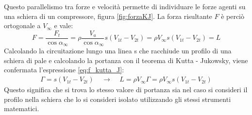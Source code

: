 Questo parallelismo tra forze e velocità permette di individuare le forze agenti su una schiera di un compressore, figura \ref{fig:forzaKJ}. La forza risultante $F$ è perciò ortogonale a $V_\infty$ e vale:
\begin{equation}\label{eq:f_kutta_J}
F=\frac{F_t}{\cos \alpha_{\infty}}=\rho \frac{V_a}{\cos \alpha_{\infty}}s(V_{1t}-V_{2t})=\rho V_\infty s (V_{1t}-V_{2t})=L
\end{equation}
Calcolando la circuitazione lungo una linea s che racchiude un profilo di una schiera di pale e calcolando la portanza con il teorema di Kutta - Jukowsky, viene confermata l'espressione \ref{eq:f_kutta_J}:
\begin{align*}
\Gamma=s(V_{1t}-V_{2t}) \;\;\;\; \rightarrow \;\;\;\; L=\rho V_\infty \Gamma=\rho V_\infty s (V_{1t}-V_{2t})
\end{align*}
Questo significa che si trova lo stesso valore di portanza sia nel caso si consideri il profilo nella schiera che lo si consideri isolato utilizzando gli stessi strumenti matematici.
